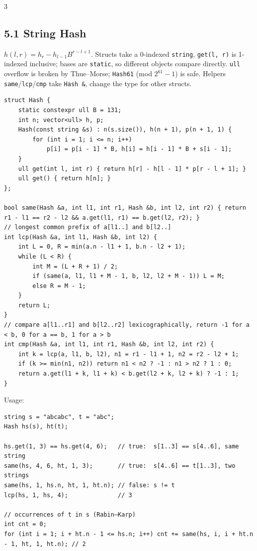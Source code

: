 \documentclass[8pt]{extarticle}
\begin{document}
\begin{multicols*}{3}
\subsection*{5.1 String Hash}

$h(l, r) = h_r - h_{l-1} B^{r-l+1}$. Structs take a 0-indexed \texttt{string}, \texttt{get(l, r)} is 1-indexed inclusive; bases are \texttt{static}, so different objects compare directly. \texttt{ull} overflow is broken by Thue--Morse; \texttt{Hash61} (mod $2^{61}-1$) is safe. Helpers \texttt{same}/\texttt{lcp}/\texttt{cmp} take \texttt{Hash \&}, change the type for other structs.

\begin{lstlisting}
struct Hash {
    static constexpr ull B = 131;
    int n; vector<ull> h, p;
    Hash(const string &s) : n(s.size()), h(n + 1), p(n + 1, 1) {
        for (int i = 1; i <= n; i++)
            p[i] = p[i - 1] * B, h[i] = h[i - 1] * B + s[i - 1];
    }
    ull get(int l, int r) { return h[r] - h[l - 1] * p[r - l + 1]; }
    ull get() { return h[n]; }
};

bool same(Hash &a, int l1, int r1, Hash &b, int l2, int r2) { return r1 - l1 == r2 - l2 && a.get(l1, r1) == b.get(l2, r2); }
// longest common prefix of a[l1..] and b[l2..]
int lcp(Hash &a, int l1, Hash &b, int l2) {
    int L = 0, R = min(a.n - l1 + 1, b.n - l2 + 1);
    while (L < R) {
        int M = (L + R + 1) / 2;
        if (same(a, l1, l1 + M - 1, b, l2, l2 + M - 1)) L = M;
        else R = M - 1;
    }
    return L;
}
// compare a[l1..r1] and b[l2..r2] lexicographically, return -1 for a < b, 0 for a == b, 1 for a > b
int cmp(Hash &a, int l1, int r1, Hash &b, int l2, int r2) {
    int k = lcp(a, l1, b, l2), n1 = r1 - l1 + 1, n2 = r2 - l2 + 1;
    if (k >= min(n1, n2)) return n1 < n2 ? -1 : n1 > n2 ? 1 : 0;
    return a.get(l1 + k, l1 + k) < b.get(l2 + k, l2 + k) ? -1 : 1;
}
\end{lstlisting}

Usage:

\begin{lstlisting}
string s = "abcabc", t = "abc";
Hash hs(s), ht(t);

hs.get(1, 3) == hs.get(4, 6);   // true:  s[1..3] == s[4..6], same string
same(hs, 4, 6, ht, 1, 3);       // true:  s[4..6] == t[1..3], two strings
same(hs, 1, hs.n, ht, 1, ht.n); // false: s != t
lcp(hs, 1, hs, 4);              // 3

// occurrences of t in s (Rabin–Karp)
int cnt = 0;
for (int i = 1; i + ht.n - 1 <= hs.n; i++) cnt += same(hs, i, i + ht.n - 1, ht, 1, ht.n); // 2


\end{lstlisting}
\end{multicols*}
\end{document}
